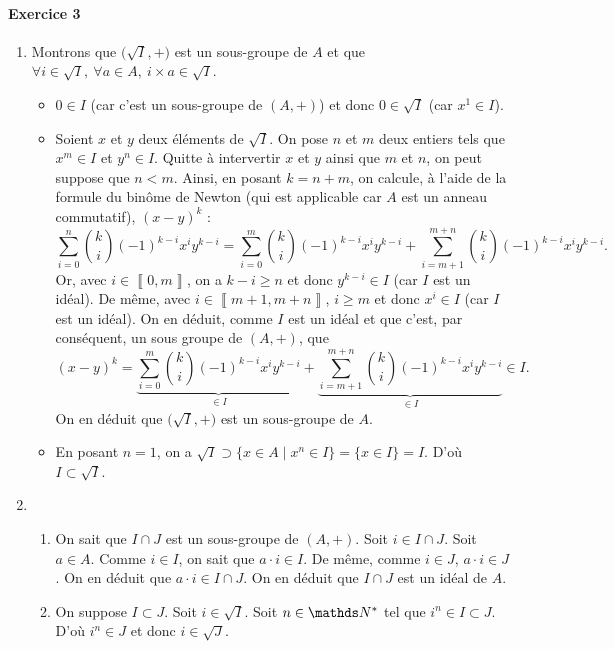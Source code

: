 \documentclass[a4paper]{article}
\begin{document}
	\paragraph{Exercice 3}
	\begin{enumerate}
		\item Montrons que $\big(\sqrt{I}, +\big)$\/ est un sous-groupe de $A$\/ et que $\forall i \in \sqrt{I},\:\forall a \in A,\: i \times a \in \sqrt{I}$.
			\begin{itemize}
				\item $0 \in I$\/ (car c'est un sous-groupe de $(A,+)$) et donc $0 \in \sqrt{I}$\/ (car $x^1 \in I$).
				\item Soient $x$\/ et $y$\/ deux éléments de $\sqrt{I}$. On pose $n$\/ et $m$\/ deux entiers tels que $x^m \in I$\/ et $y^n \in I$. Quitte à intervertir $x$\/ et $y$ ainsi que $m$\/ et $n$, on peut suppose que $n < m$. Ainsi, en posant $k = n + m$, on calcule, à l'aide de la formule du binôme de {\sc Newton} (qui est applicable car $A$\/ est un anneau commutatif), $(x-y)^{k}$\/ : \[
							\sum_{i=0}^n {k \choose i} (-1)^{k-i} x^{i} y^{k-i} = \sum_{i=0}^{m} {k \choose i} (-1)^{k-i} x^i y^{k-i}  + \sum_{i=m + 1}^{m+n} {k \choose i} (-1)^{k-i} x^i y^{k-i}
					.\] Or, avec $i \in \left\llbracket 0,m \right\rrbracket$, on a $k-i \ge n$\/ et donc $y^{k-i} \in I$ (car $I$\/ est un idéal).
					De même, avec $i \in \left\llbracket m+1,m+n \right\rrbracket$, $i \ge m$\/ et donc $x^{i} \in I$\/ (car $I$\/ est un idéal).
					On en déduit, comme $I$\/ est un idéal et que c'est, par conséquent, un sous groupe de $(A,+)$, que \[
						(x-y)^k = \underbrace{\sum_{i=0}^m {k\choose i} (-1)^{k-i} x^i y^{k-i}}_{\in I} + \underbrace{\sum_{i=m+1}^{m+n} {k\choose i} (-1)^{k-i} x^{i} y^{k-i}}_{\in I} \in I
					.\]
					On en déduit que $\big(\sqrt{I}, +\big)$\/ est un sous-groupe de $A$.
				\item En posant $n = 1$, on a $\sqrt{I} \supset \{x \in A  \mid x^n \in I\} = \{x \in I\} = I$. D'où $I \subset \sqrt{I}$.
			\end{itemize}
		\item
			\begin{enumerate}
				\item On sait que $I \cap J$\/ est un sous-groupe de $(A, +)$. Soit $i \in I \cap J$. Soit $a \in A$. Comme $i \in I$, on sait que $a\cdot i \in I$. De même, comme $i \in J$, $a\cdot i \in J$. On en déduit que $a\cdot i \in I \cap J$. On en déduit que $I \cap J$\/ est un idéal de $A$.
				\item On suppose $I \subset J$. Soit $i \in \sqrt{I}$. Soit $n \in \N^*$\/ tel que $i^n \in I \subset J$. D'où $i^n \in J$\/ et donc $i \in \sqrt{J}$.

\end{enumerate}
\end{enumerate}
\end{document}
